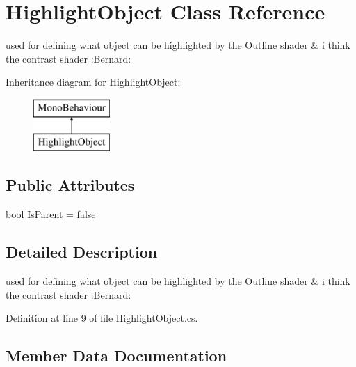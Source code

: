 \hypertarget{class_highlight_object}{}\section{Highlight\+Object Class Reference}
\label{class_highlight_object}


used for defining what object can be highlighted by the Outline shader \& i think the contrast shader \+:Bernard\+:  


Inheritance diagram for Highlight\+Object\+:\begin{figure}[H]
\begin{center}
\leavevmode
\includegraphics[height=2.000000cm]{class_highlight_object}
\end{center}
\end{figure}
\subsection*{Public Attributes}
\begin{DoxyCompactItemize}
\item 
bool \mbox{\hyperlink{class_highlight_object_a114d75d26ea233f4008040419d6d440f}{Is\+Parent}} = false
\end{DoxyCompactItemize}


\subsection{Detailed Description}
used for defining what object can be highlighted by the Outline shader \& i think the contrast shader \+:Bernard\+: 



Definition at line 9 of file Highlight\+Object.\+cs.



\subsection{Member Data Documentation}
\mbox{\label{class_highlight_object_a114d75d26ea233f4008040419d6d440f}} 
